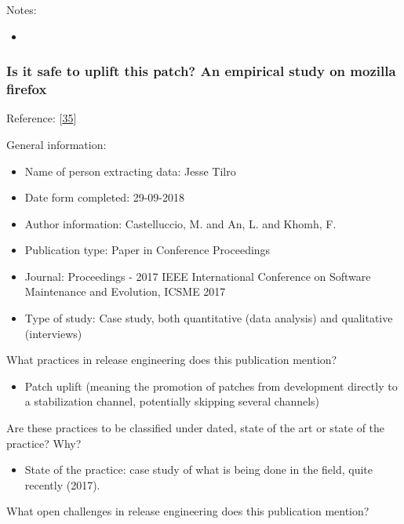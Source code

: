 \documentclass[]{book}
\providecommand{\tightlist}{%
  \setlength{\itemsep}{0pt}\setlength{\parskip}{0pt}}
\begin{document}
Notes:

\begin{itemize}
\item
\end{itemize}

\subsubsection{Is it safe to uplift this patch? An empirical study on
mozilla
firefox}\label{is-it-safe-to-uplift-this-patch-an-empirical-study-on-mozilla-firefox}

Reference: {[}\protect\hyperlink{ref-castelluccio2017a}{35}{]}

General information:

\begin{itemize}
\tightlist
\item
  Name of person extracting data: Jesse Tilro
\item
  Date form completed: 29-09-2018
\item
  Author information: Castelluccio, M. and An, L. and Khomh, F.
\item
  Publication type: Paper in Conference Proceedings
\item
  Journal: Proceedings - 2017 IEEE International Conference on Software
  Maintenance and Evolution, ICSME 2017
\item
  Type of study: Case study, both quantitative (data analysis) and
  qualitative (interviews)
\end{itemize}

What practices in release engineering does this publication mention?

\begin{itemize}
\tightlist
\item
  Patch uplift (meaning the promotion of patches from development
  directly to a stabilization channel, potentially skipping several
  channels)
\end{itemize}

Are these practices to be classified under dated, state of the art or
state of the practice? Why?

\begin{itemize}
\tightlist
\item
  State of the practice: case study of what is being done in the field,
  quite recently (2017).
\end{itemize}

What open challenges in release engineering does this publication
mention?
\end{document}

